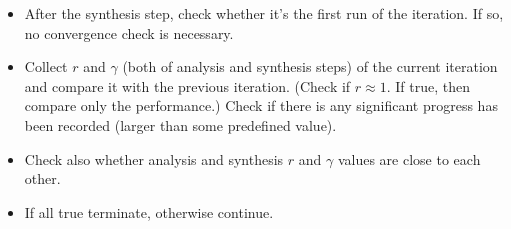 \begin{itemize}
	\item After the synthesis step, check whether it's the first run of the iteration. If so, no convergence check is
	necessary.
	\item Collect $r$ and $\gamma$ (both of analysis and synthesis steps) of the current iteration and compare it with 
	the previous iteration. (Check if $r\approx 1$. If true, then compare only the performance.) Check if there is any 
	significant progress has been recorded (larger than some predefined value).
	\item Check also whether analysis and synthesis $r$ and $\gamma$ values are close to each other. 
	\item If all true terminate, otherwise continue. 
\end{itemize}



%
%
%

